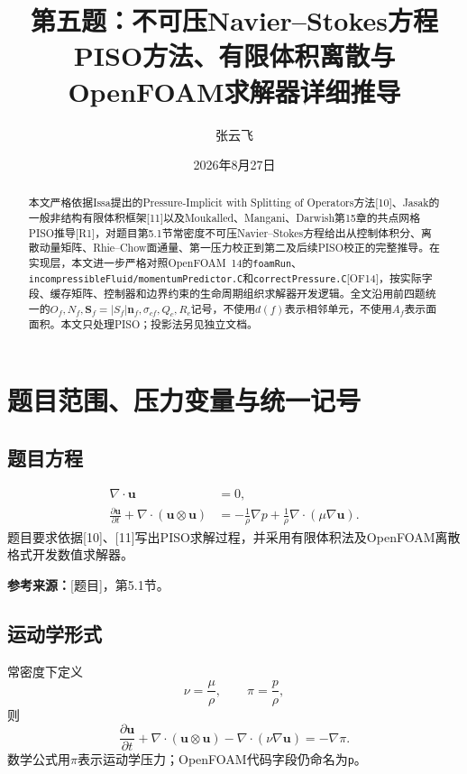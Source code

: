 \documentclass[UTF8,12pt,a4paper]{ctexart}
\title{\bfseries 第五题：不可压Navier--Stokes方程\\PISO方法、有限体积离散与OpenFOAM求解器详细推导}
\author{张云飞}
\date{2026年8月27日}
\numberwithin{equation}{section}
\newcommand{\Task}{\textnormal{[题目]}}
\newcommand{\Issa}{\textnormal{[10]}}
\newcommand{\Jasak}{\textnormal{[11]}}
\newcommand{\Rone}{\textnormal{[R1]}}
\newcommand{\OFfourteen}{\textnormal{[OF14]}}
\newcommand{\source}[1]{\par\smallskip\noindent\colorbox{sourcebg}{%
  \parbox{0.955\linewidth}{\footnotesize\color{sourcegray}\textbf{参考来源：}#1}}\par\smallskip}
\begin{document}
\maketitle
\begin{abstract}
本文严格依据Issa提出的Pressure-Implicit with Splitting of Operators方法\Issa、Jasak的一般非结构有限体积框架\Jasak 以及Moukalled、Mangani、Darwish第15章的共点网格PISO推导\Rone，对题目第5.1节常密度不可压Navier--Stokes方程给出从控制体积分、离散动量矩阵、Rhie--Chow面通量、第一压力校正到第二及后续PISO校正的完整推导。在实现层，本文进一步严格对照OpenFOAM~14的\texttt{foamRun}、\texttt{incompressibleFluid/momentumPredictor.C}和\texttt{correctPressure.C}\OFfourteen，按实际字段、缓存矩阵、控制器和边界约束的生命周期组织求解器开发逻辑。全文沿用前四题统一的$O_f,N_f,\bm S_f=|S_f|\bm n_f,\sigma_{cf},Q_c,R_c$记号，不使用$d(f)$表示相邻单元，不使用$A_f$表示面面积。本文只处理PISO；投影法另见独立文档。
\end{abstract}
\tableofcontents
\newpage

\section*{题目范围、压力变量与统一记号}
\subsection*{题目方程}
\begin{align}
  \nabla\cdot\bm u&=0,\label{eq:continuity}\\
  \frac{\partial\bm u}{\partial t}+\nabla\cdot(\bm u\otimes\bm u)
  &=-\frac1\rho\nabla p+\frac1\rho\nabla\cdot(\mu\nabla\bm u).
  \label{eq:momentum}
\end{align}
题目要求依据\Issa、\Jasak 写出PISO求解过程，并采用有限体积法及OpenFOAM离散格式开发数值求解器。
\source{\Task，第5.1节。}

\subsection*{运动学形式}
常密度下定义
\begin{equation}
  \boxed{\nu=\frac{\mu}{\rho},\qquad \pi=\frac{p}{\rho},}
  \label{eq:kinematic}
\end{equation}
则
\begin{equation}
  \frac{\partial\bm u}{\partial t}
  +\nabla\cdot(\bm u\otimes\bm u)
  -\nabla\cdot(\nu\nabla\bm u)=-\nabla\pi.
  \label{eq:momentum_pi}
\end{equation}
数学公式用$\pi$表示运动学压力；OpenFOAM代码字段仍命名为\texttt{p}。
\end{document}
